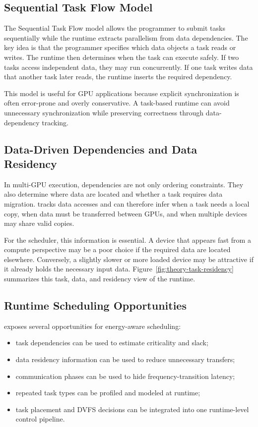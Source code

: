 \subsection{Sequential Task Flow Model}
\label{subsec:stf_model}

The Sequential Task Flow model allows the programmer to submit tasks sequentially while the runtime extracts parallelism from data dependencies. The key idea is that the programmer specifies which data objects a task reads or writes. The runtime then determines when the task can execute safely. If two tasks access independent data, they may run concurrently. If one task writes data that another task later reads, the runtime inserts the required dependency.

This model is useful for GPU applications because explicit synchronization is often error-prone and overly conservative. A task-based runtime can avoid unnecessary synchronization while preserving correctness through data-dependency tracking.

\subsection{Data-Driven Dependencies and Data Residency}
\label{subsec:cudastf_data_dependencies}

In multi-GPU execution, dependencies are not only ordering constraints. They also determine where data are located and whether a task requires data migration. \CUDASTF{} tracks data accesses and can therefore infer when a task needs a local copy, when data must be transferred between GPUs, and when multiple devices may share valid copies.

For the scheduler, this information is essential. A device that appears fast from a compute perspective may be a poor choice if the required data are located elsewhere. Conversely, a slightly slower or more loaded device may be attractive if it already holds the necessary input data. Figure~\ref{fig:theory-task-residency} summarizes this task, data, and residency view of the runtime.

\figTheoryTaskResidency

\subsection{Runtime Scheduling Opportunities}
\label{subsec:cudastf_scheduling_opportunities}

\CUDASTF{} exposes several opportunities for energy-aware scheduling:
\begin{itemize}
    \item task dependencies can be used to estimate criticality and slack;
    \item data residency information can be used to reduce unnecessary transfers;
    \item communication phases can be used to hide frequency-transition latency;
    \item repeated task types can be profiled and modeled at runtime;
    \item task placement and DVFS decisions can be integrated into one runtime-level control pipeline.
\end{itemize}

